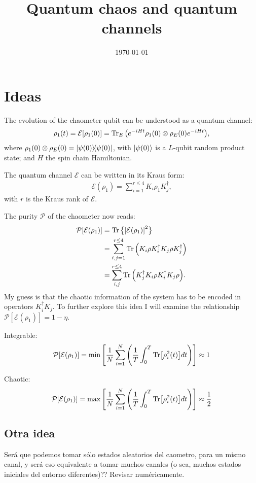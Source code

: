 \documentclass[10pt,letterpaper]{article}
\title{Quantum chaos and quantum channels}
\author{}
\date{\today}
\newcommand{\mcE}{\mathcal E}
\newcommand{\mcP}{\mathcal P}
\begin{document}
\maketitle

\section{Ideas}
The evolution of the chaometer qubit can be understood as a quantum channel:
\begin{align}
\rho_1(t) = 
\mcE[\rho_1(0)] = 
\Tr_E\qty(e^{-iHt} \rho_1(0)\otimes \rho_E(0) e^{-iHt}),
\end{align}
where $\rho_1(0) \otimes \rho_E(0) = \dyad{\psi(0)}$, 
with $\ket{\psi(0)}$ is a $L$-qubit random product state; and $H$ the spin chain 
Hamiltonian.

The quantum channel $\mcE$ can be written in its Kraus form:
\begin{align}
\mcE(\rho_1) = 
\sum_{i=1}^{r\leq 4} K_i \rho_1 K_j^\dagger,
\end{align}
with $r$ is the Kraus rank of $\mcE$.

The purity $\mcP$ of the chaometer now reads:
\begin{align}
\mcP [\mcE(\rho_1)] &=
\Tr \big\{\qty[\mcE(\rho_1)]^2 \big\}\\
&= \sum_{i,j=1}^{r\leq 4}
\Tr \qty( K_i \rho K_i^\dagger K_j \rho K_j^\dagger) \\
&= \sum_{i,j}^{r\leq 4}
\Tr \qty( K_j^\dagger K_i \rho K_i^\dagger K_j \rho).
\end{align}
My guess is that the chaotic information of the system has to be 
encoded in operators $K_i^\dagger K_j$. To further explore this idea 
I will examine the relationship $\mcP [\mcE(\rho_1)]  = 1 - \eta $.

Integrable:
\begin{align}
\mcP [\mcE(\rho_1)] = 
\min \qty[
\frac{1}{N} \sum_{i=1}^N 
\qty(\frac{1}{T}\int_0^T 
\Tr [\rho_i^2(t)] dt
)
] \approx 1
\end{align}

Chaotic:
\begin{align}
\mcP [\mcE(\rho_1)] = 
\max \qty[
\frac{1}{N} \sum_{i=1}^N 
\qty(\frac{1}{T}\int_0^T 
\Tr [\rho_i^2(t)] dt
)
] \approx \frac{1}{2}
\end{align}

\subsection{Otra idea}
Será que podemos tomar sólo estados aleatorios del caometro, para un mismo canal, 
y será eso equivalente a tomar muchos canales (o sea, muchos estados iniciales del entorno diferentes)?? Revisar numéricamente.
\end{document}
